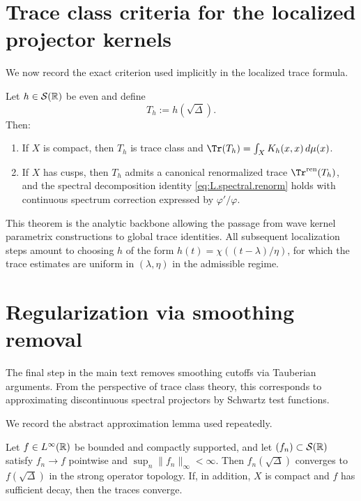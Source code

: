 \section{Trace class criteria for the localized projector kernels}
\label{sec:L.projector.criteria}

We now record the exact criterion used implicitly in the localized trace formula.

\begin{theorem}
\label{thm:L.localized.traceclass}
Let $h\in\mathcal{S}(\mathbb{R})$ be even and define
\[
T_h := h(\sqrt{\Delta}).
\]
Then:
\begin{enumerate}
\item If $X$ is compact, then $T_h$ is trace class and $\Tr(T_h)=\int_X K_h(x,x)\,d\mu(x)$.
\item If $X$ has cusps, then $T_h$ admits a canonical renormalized trace $\Tr^{\mathrm{ren}}(T_h)$, and the spectral
decomposition identity \eqref{eq:L.spectral.renorm} holds with continuous spectrum correction expressed by
$\varphi'/\varphi$.
\end{enumerate}
\end{theorem}

\begin{remark}
\label{rem:L.projector.use}
This theorem is the analytic backbone allowing the passage from wave kernel parametrix constructions to global trace
identities.  All subsequent localization steps amount to choosing $h$ of the form
$h(t)=\chi((t-\lambda)/\eta)$, for which the trace estimates are uniform in $(\lambda,\eta)$ in the admissible regime.
\end{remark}

\section{Regularization via smoothing removal}
\label{sec:L.smoothing.removal}

The final step in the main text removes smoothing cutoffs via Tauberian arguments.  From the perspective of trace
class theory, this corresponds to approximating discontinuous spectral projectors by Schwartz test functions.

We record the abstract approximation lemma used repeatedly.

\begin{lemma}
\label{lem:L.approx.projectors}
Let $f\in L^\infty(\mathbb{R})$ be bounded and compactly supported, and let $(f_n)\subset \mathcal{S}(\mathbb{R})$ satisfy
$f_n\to f$ pointwise and $\sup_n\|f_n\|_\infty<\infty$.
Then $f_n(\sqrt{\Delta})$ converges to $f(\sqrt{\Delta})$ in the strong operator topology.
If, in addition, $X$ is compact and $f$ has sufficient decay, then the traces converge.
\end{lemma}

